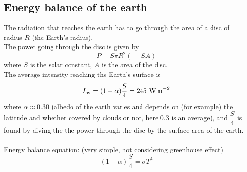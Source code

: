 \subsection{Energy balance of the earth}
\begin{center}
\end{center}
The radiation that reaches the earth has to go through the area of a disc of radius $R$ (the Earth's radius).\\
The power going through the disc is given by
\[P=S\pi R^2(=SA)\]
where $S$ is the solar constant, $A$ is the area of the disc.\\
The average intensity reaching the Earth's surface is 
\[I_\text{av}=(1-\alpha)\dfrac{S}{4}=245\ \text{W\,m}^{-2}\]
where $\alpha\approx 0.30$ (albedo of the earth varies and depends on (for example) the latitude and whether covered by clouds or not, here 0.3 is an average), and $\dfrac{S}{4}$ is found by diving the the power through the disc by the surface area of the earth.
\\\\Energy balance equation: (very simple, not considering greenhouse effect)
\[(1-\alpha)\dfrac{S}{4}=\sigma T^4\]
